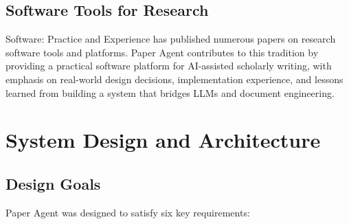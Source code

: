 \documentclass[11pt,a4paper]{article}
\newcommand{\software}{Paper Agent}
\begin{document}
\subsection{Software Tools for Research}

Software: Practice and Experience has published numerous papers on research
software tools and platforms. \software{} contributes to this tradition by
providing a practical software platform for AI-assisted scholarly writing, with
emphasis on real-world design decisions, implementation experience, and lessons
learned from building a system that bridges LLMs and document engineering.

\section{System Design and Architecture}

\subsection{Design Goals}

\software{} was designed to satisfy six key requirements:
\end{document}
